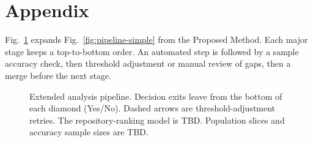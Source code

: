 \section{Appendix}

Fig.~\ref{fig:pipeline-extended} expands Fig.~\ref{fig:pipeline-simple} from the
Proposed Method.
Each major stage keeps a top-to-bottom order. An automated step is followed by a
sample accuracy check, then threshold adjustment or manual review of gaps, then
a merge before the next stage.

\clearpage
\begin{figure}[p]
  \centering
  \resizebox{!}{0.92\textheight}{}
  \caption{Extended analysis pipeline.
    Decision exits leave from the bottom of each diamond (Yes/No).
    Dashed arrows are threshold-adjustment retries.
    The repository-ranking model is TBD. Population slices and accuracy sample
    sizes are TBD.}
  \label{fig:pipeline-extended}
\end{figure}
